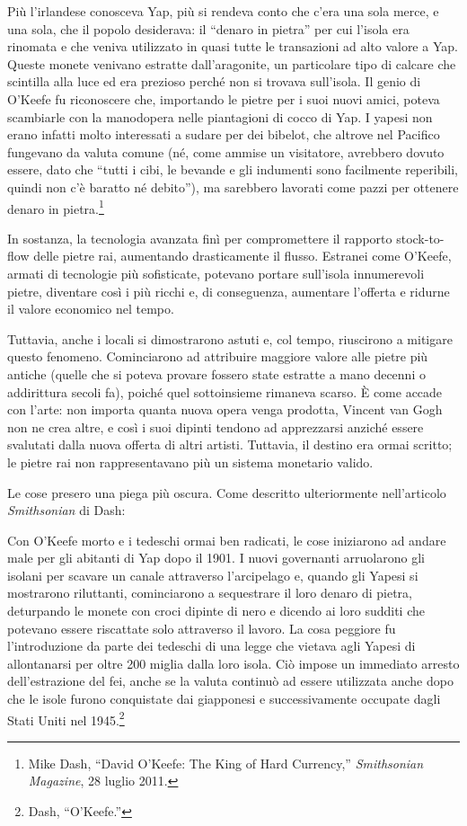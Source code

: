 \documentclass[
  a5paper,
  smalldemyvopaper,10pt,twoside,onecolumn,openright,extrafontsizes,hidelinks]{memoir}
\renewenvironment{quote}%
               {\list{}{\rightmargin=.6cm\leftmargin=.6cm}%
                \itshape \item[]}%
               {\endlist}
\begin{document}
\begin{quote}
Più l'irlandese conosceva Yap, più si rendeva conto che c'era una sola
merce, e una sola, che il popolo desiderava: il ``denaro in pietra'' per
cui l'isola era rinomata e che veniva utilizzato in quasi tutte le
transazioni ad alto valore a Yap. Queste monete venivano estratte
dall'aragonite, un particolare tipo di calcare che scintilla alla luce
ed era prezioso perché non si trovava sull'isola. Il genio di O'Keefe fu
riconoscere che, importando le pietre per i suoi nuovi amici, poteva
scambiarle con la manodopera nelle piantagioni di cocco di Yap. I yapesi
non erano infatti molto interessati a sudare per dei bibelot, che
altrove nel Pacifico fungevano da valuta comune (né, come ammise un
visitatore, avrebbero dovuto essere, dato che ``tutti i cibi, le bevande
e gli indumenti sono facilmente reperibili, quindi non c'è baratto né
debito''), ma sarebbero lavorati come pazzi per ottenere denaro in
pietra.\footnote{Mike Dash, ``David O'Keefe: The King of Hard
  Currency,'' \emph{Smithsonian Magazine}, 28 luglio 2011.}
\end{quote}

In sostanza, la tecnologia avanzata finì per compromettere il rapporto
stock-to-flow delle pietre rai, aumentando drasticamente il flusso.
Estranei come O'Keefe, armati di tecnologie più sofisticate, potevano
portare sull'isola innumerevoli pietre, diventare così i più ricchi e,
di conseguenza, aumentare l'offerta e ridurne il valore economico nel
tempo.

Tuttavia, anche i locali si dimostrarono astuti e, col tempo, riuscirono
a mitigare questo fenomeno. Cominciarono ad attribuire maggiore valore
alle pietre più antiche (quelle che si poteva provare fossero state
estratte a mano decenni o addirittura secoli fa), poiché quel
sottoinsieme rimaneva scarso. È come accade con l'arte: non importa
quanta nuova opera venga prodotta, Vincent van Gogh non ne crea altre, e
così i suoi dipinti tendono ad apprezzarsi anziché essere svalutati
dalla nuova offerta di altri artisti. Tuttavia, il destino era ormai
scritto; le pietre rai non rappresentavano più un sistema monetario
valido.

Le cose presero una piega più oscura. Come descritto ulteriormente
nell'articolo \emph{Smithsonian} di Dash:

\begin{quote}
Con O'Keefe morto e i tedeschi ormai ben radicati, le cose iniziarono ad
andare male per gli abitanti di Yap dopo il 1901. I nuovi governanti
arruolarono gli isolani per scavare un canale attraverso l'arcipelago e,
quando gli Yapesi si mostrarono riluttanti, cominciarono a sequestrare
il loro denaro di pietra, deturpando le monete con croci dipinte di nero
e dicendo ai loro sudditi che potevano essere riscattate solo attraverso
il lavoro. La cosa peggiore fu l'introduzione da parte dei tedeschi di
una legge che vietava agli Yapesi di allontanarsi per oltre 200 miglia
dalla loro isola. Ciò impose un immediato arresto dell'estrazione del
fei, anche se la valuta continuò ad essere utilizzata anche dopo che le
isole furono conquistate dai giapponesi e successivamente occupate dagli
Stati Uniti nel 1945.\footnote{Dash, ``O'Keefe.''}
\end{quote}
\end{document}
